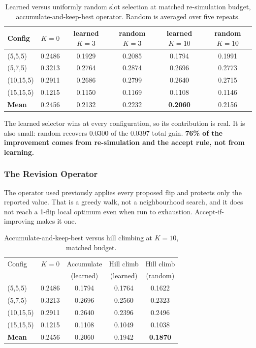 \begin{table}[t]
\centering
\small
\caption{Learned versus uniformly random slot selection at matched
re-simulation budget, accumulate-and-keep-best operator. Random is averaged
over five repeats.}
\label{tab:learned-vs-random}
\begin{tabular}{@{}lccccc@{}}
\toprule
Config & $K{=}0$ & learned $K{=}3$ & random $K{=}3$ & learned $K{=}10$ & random $K{=}10$ \\
\midrule
(5,5,5)    & 0.2486 & 0.1929 & 0.2085 & 0.1794 & 0.1991 \\
(5,7,5)    & 0.3213 & 0.2764 & 0.2874 & 0.2696 & 0.2773 \\
(10,15,5)  & 0.2911 & 0.2686 & 0.2799 & 0.2640 & 0.2715 \\
(15,15,5)  & 0.1215 & 0.1150 & 0.1169 & 0.1108 & 0.1146 \\
\midrule
\textbf{Mean} & 0.2456 & 0.2132 & 0.2232 & \textbf{0.2060} & 0.2156 \\
\bottomrule
\end{tabular}
\end{table}

The learned selector wins at every configuration, so its contribution is real.
It is also small: random recovers 0.0300 of the 0.0397 total gain. \textbf{76\%
of the improvement comes from re-simulation and the accept rule, not from
learning.}

\subsubsection{The Revision Operator}
\label{sec:operator}

The operator used previously applies every proposed flip and protects only the
reported value. That is a greedy walk, not a neighbourhood search, and
it does not reach a 1-flip local optimum even when run to exhaustion. Accept-if-improving
makes it one.

\begin{table}[t]
\centering
\small
\caption{Accumulate-and-keep-best versus hill climbing at $K{=}10$, matched
budget.}
\label{tab:operator}
\begin{tabular}{@{}lcccc@{}}
\toprule
Config & $K{=}0$ & Accumulate & Hill climb & Hill climb \\
       &         & (learned)  & (learned)  & (random)   \\
\midrule
(5,5,5)   & 0.2486 & 0.1794 & 0.1764 & 0.1622 \\
(5,7,5)   & 0.3213 & 0.2696 & 0.2560 & 0.2323 \\
(10,15,5) & 0.2911 & 0.2640 & 0.2396 & 0.2496 \\
(15,15,5) & 0.1215 & 0.1108 & 0.1049 & 0.1038 \\
\midrule
\textbf{Mean} & 0.2456 & 0.2060 & 0.1942 & \textbf{0.1870} \\
\bottomrule
\end{tabular}
\end{table}


